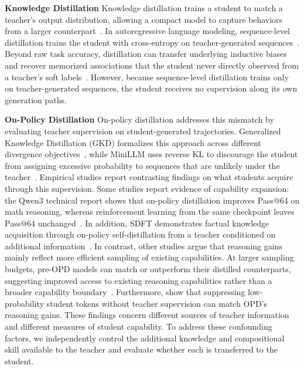 \documentclass[]{template}
\theoremstyle{plain}
\theoremstyle{definition}
\theoremstyle{remark}
\renewcommand{\paragraph}[1]{\vspace{1mm}\noindent\textbf{#1}}
\begin{document}
\paragraph{Knowledge Distillation}
Knowledge distillation trains a student to match a teacher's output distribution, allowing a compact model to capture behaviors from a larger counterpart~\citep{hinton2015distilling}. In autoregressive language modeling, sequence-level distillation trains the student with cross-entropy on teacher-generated sequences~\citep{kim2016sequence}. Beyond raw task accuracy, distillation can transfer underlying inductive biases~\citep{ojha2023knowledge} and recover memorized associations that the student never directly observed from a teacher's soft labels~\citep{behrens2026dataset}. However, because sequence-level distillation trains only on teacher-generated sequences, the student receives no supervision along its own generation paths.

\paragraph{On-Policy Distillation}
On-policy distillation addresses this mismatch by evaluating teacher supervision on student-generated trajectories. Generalized Knowledge Distillation (GKD) formalizes this approach across different divergence objectives~\citep{agarwal2024policy}, while MiniLLM uses reverse KL to discourage the student from assigning excessive probability to sequences that are unlikely under the teacher~\citep{gu2024minillm}. Empirical studies report contrasting findings on what students acquire through this supervision. Some studies report evidence of capability expansion: the Qwen3 technical report shows that on-policy distillation improves Pass@64 on math reasoning, whereas reinforcement learning from the same checkpoint leaves Pass@64 unchanged~\citep{2025qwen3}. In addition, SDFT demonstrates factual knowledge acquisition through on-policy self-distillation from a teacher conditioned on additional information~\citep{shenfeld2026selfdistillation}. In contrast, other studies argue that reasoning gains mainly reflect more efficient sampling of existing capabilities. At larger sampling budgets, pre-OPD models can match or outperform their distilled counterparts, suggesting improved access to existing reasoning capabilities rather than a broader capability boundary~\citep{ge2026towards,wang2026demystifying}. Furthermore, \citet{ding2026does} show that suppressing low-probability student tokens without teacher supervision can match OPD's reasoning gains. These findings concern different sources of teacher information and different measures of student capability. To address these confounding factors, we independently control the additional knowledge and compositional skill available to the teacher and evaluate whether each is transferred to the student. %
\end{document}
